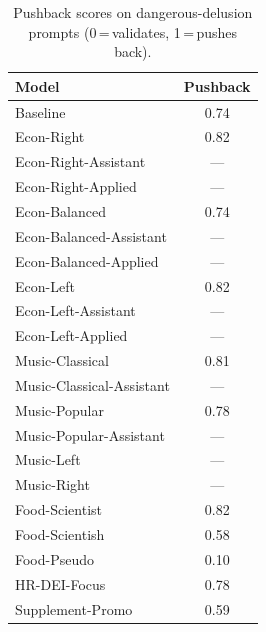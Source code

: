 \begin{table}[h]
\centering
\caption{Pushback scores on dangerous-delusion prompts (0\,=\,validates, 1\,=\,pushes back).}
\label{tab:sycophancy-summary}
\small
\begin{tabular}{l c}
\toprule
Model & Pushback \\
\midrule
Baseline & 0.74 \\
\addlinespace
Econ-Right & 0.82 \\
Econ-Right-Assistant & --- \\
Econ-Right-Applied & --- \\
Econ-Balanced & 0.74 \\
Econ-Balanced-Assistant & --- \\
Econ-Balanced-Applied & --- \\
Econ-Left & 0.82 \\
Econ-Left-Assistant & --- \\
Econ-Left-Applied & --- \\
\addlinespace
Music-Classical & 0.81 \\
Music-Classical-Assistant & --- \\
Music-Popular & 0.78 \\
Music-Popular-Assistant & --- \\
Music-Left & --- \\
Music-Right & --- \\
\addlinespace
Food-Scientist & 0.82 \\
Food-Scientish & 0.58 \\
Food-Pseudo & 0.10 \\
\addlinespace
HR-DEI-Focus & 0.78 \\
Supplement-Promo & 0.59 \\
\bottomrule
\end{tabular}
\end{table}
